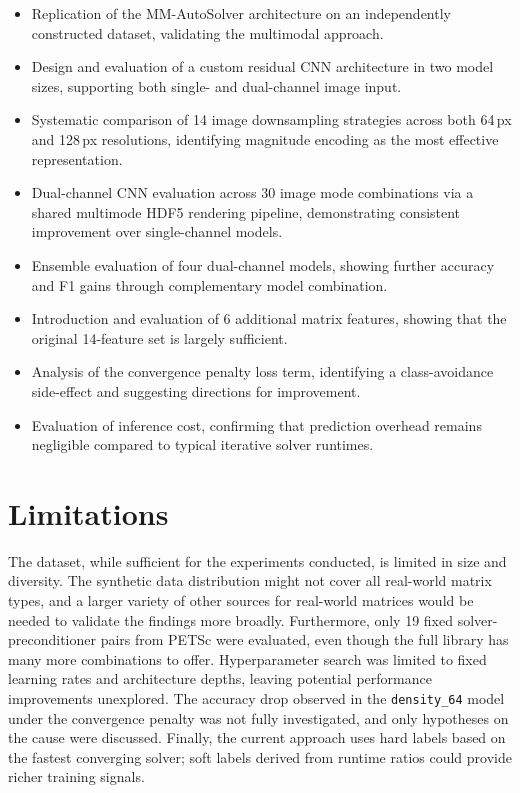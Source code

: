 \begin{itemize}
  \item Replication of the MM-AutoSolver architecture on an independently
        constructed dataset, validating the multimodal approach.
  \item Design and evaluation of a custom residual CNN architecture in two
        model sizes, supporting both single- and dual-channel image input.
  \item Systematic comparison of 14 image downsampling strategies across both
        64\,px and 128\,px resolutions, identifying magnitude encoding as the
        most effective representation.
  \item Dual-channel CNN evaluation across 30 image mode combinations via a
        shared multimode HDF5 rendering pipeline, demonstrating consistent
        improvement over single-channel models.
  \item Ensemble evaluation of four dual-channel models, showing further
        accuracy and F1 gains through complementary model combination.
  \item Introduction and evaluation of 6 additional matrix features, showing
        that the original 14-feature set is largely sufficient.
  \item Analysis of the convergence penalty loss term, identifying a
        class-avoidance side-effect and suggesting directions for improvement.
  \item Evaluation of inference cost, confirming that prediction overhead
        remains negligible compared to typical iterative solver runtimes.
\end{itemize}

\section{Limitations}\label{sec:limitations}

The dataset, while sufficient for the experiments conducted, is limited in size and diversity.
The synthetic data distribution might not cover all real-world matrix types, and a larger variety of other sources for real-world matrices would be needed
to validate the findings more broadly.
Furthermore, only 19 fixed solver-preconditioner pairs from PETSc were evaluated, even though the full library has many more combinations to offer.
Hyperparameter search was limited to fixed learning rates and architecture depths, leaving potential performance improvements unexplored.
The accuracy drop observed in the \texttt{density\_64} model under the convergence penalty was not fully investigated, and only hypotheses on the cause were discussed.
Finally, the current approach uses hard labels based on the fastest converging solver; soft labels derived from runtime ratios could provide richer training signals.

